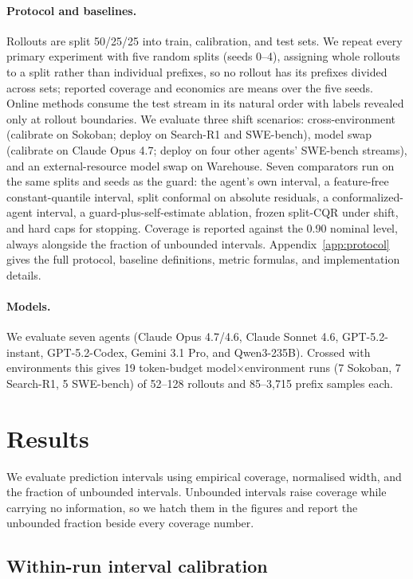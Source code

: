 \documentclass{article}
\begin{document}
\paragraph{Protocol and baselines.} Rollouts are split 50/25/25 into train,
calibration, and test sets. We repeat every primary experiment with five random splits
(seeds 0--4), assigning whole rollouts to a split rather than individual prefixes, so
no rollout has its prefixes divided across sets; reported coverage and economics are
means over the five seeds. Online methods consume the test stream in its natural order
with labels revealed only at rollout boundaries. We evaluate three shift scenarios:
cross-environment (calibrate on Sokoban; deploy on Search-R1 and SWE-bench), model swap
(calibrate on Claude Opus 4.7; deploy on four other agents' SWE-bench streams), and an
external-resource model swap on Warehouse. Seven comparators run on the same splits and
seeds as the guard: the agent's own interval, a feature-free constant-quantile
interval, split conformal on absolute residuals, a conformalized-agent interval, a
guard-plus-self-estimate ablation, frozen split-CQR under shift, and hard caps for
stopping. Coverage is reported against the 0.90 nominal level, always alongside the
fraction of unbounded intervals. Appendix~\ref{app:protocol} gives the full protocol,
baseline definitions, metric formulas, and implementation details.

\paragraph{Models.} We evaluate seven agents (Claude Opus 4.7/4.6, Claude Sonnet 4.6,
GPT-5.2-instant, GPT-5.2-Codex, Gemini 3.1 Pro, and Qwen3-235B). Crossed with
environments this gives 19 token-budget model$\times$environment runs (7 Sokoban,
7 Search-R1, 5 SWE-bench) of 52--128 rollouts and 85--3,715 prefix samples each.

\section{Results}
\label{sec:results}

We evaluate prediction intervals using empirical coverage, normalised width, and the
fraction of unbounded intervals. Unbounded intervals raise coverage while carrying no
information, so we hatch them in the figures and report the unbounded fraction beside
every coverage number.

\subsection{Within-run interval calibration}
\label{sec:within}
\end{document}
